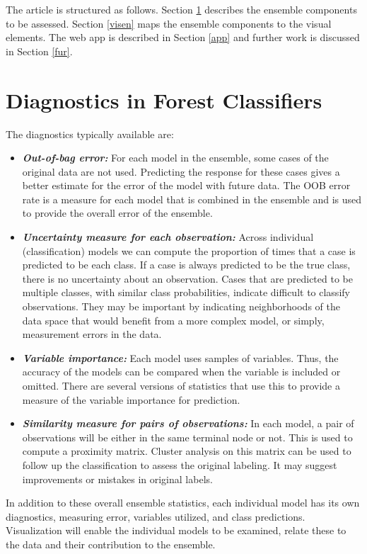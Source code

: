 \documentclass[smallextended,natbib]{svjour3}\usepackage[]{graphicx}\usepackage[]{xcolor}
\begin{document}
The article is structured as follows.  Section \ref{key} describes the ensemble components to be assessed.  Section \ref{visen} maps the ensemble components to the visual elements. The web app is described in Section \ref{app} and further work is discussed in Section \ref{fur}.

\section{Diagnostics in Forest Classifiers}\label{key}

The diagnostics typically available are:

\begin{itemize} \itemsep 0in
\item {\em \textbf{Out-of-bag error:}} For each model in the ensemble, some cases of the original data are not used. Predicting the response for these cases gives a better estimate for the error of the model with future data. The OOB error rate is a measure for each model that is combined in the ensemble and is used to provide the overall error of the ensemble.\\
  
\item {\em \textbf{Uncertainty measure for each observation:}} Across individual (classification) models we can compute the proportion of times that a case is predicted to be each class. If a case is always predicted to be the true class, there is no uncertainty about an observation. Cases that are predicted to be multiple classes, with similar class probabilities, indicate  difficult to classify observations. They may be important by indicating neighborhoods of the data space that would benefit from a more complex model, or simply, measurement errors in the data.\\
  
\item {\em \textbf{Variable importance:}} Each model uses samples of variables. Thus, the accuracy of the models can be compared when the variable is included or omitted. There are several versions of statistics that use this to provide a measure of the variable importance for prediction.\\
  
\item {\em \textbf{Similarity measure for pairs of observations:}} In each model, a pair of observations will be either in the same terminal node or not. This is used to compute a proximity matrix. Cluster analysis on this matrix can be used to follow up the classification to assess the original labeling. It may suggest improvements or mistakes in original labels.
\end{itemize}
In addition to these overall ensemble statistics, each individual model has its own diagnostics, measuring error, variables utilized, and class predictions. Visualization will enable the individual models to be examined, relate these to the data and their contribution to the ensemble.
\end{document}
